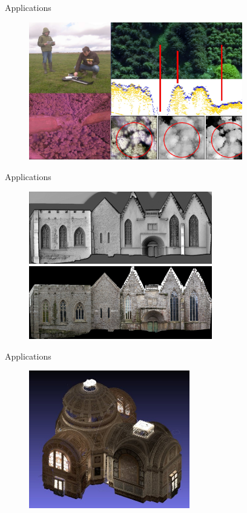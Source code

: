 \documentclass{beamer}
\begin{document}
		\begin{frame}{Applications}
			 
			\begin{figure}
			  \includegraphics[height=6cm]{../MicmacQuickMay2018/images/usage1}
			\end{figure}
		\end{frame}	
		\begin{frame}{Applications}
			 
			\begin{figure}
			  \includegraphics[width=8cm]{../MicmacQuickMay2018/images/usage5a}\\
			  \includegraphics[width=8cm]{../MicmacQuickMay2018/images/usage5b}
			\end{figure}
		\end{frame}	
		\begin{frame}{Applications}
			 
			\begin{figure}
			  \includegraphics[height=6cm]{../MicmacQuickMay2018/images/usage3}
			\end{figure}
		\end{frame}	
\end{document}
